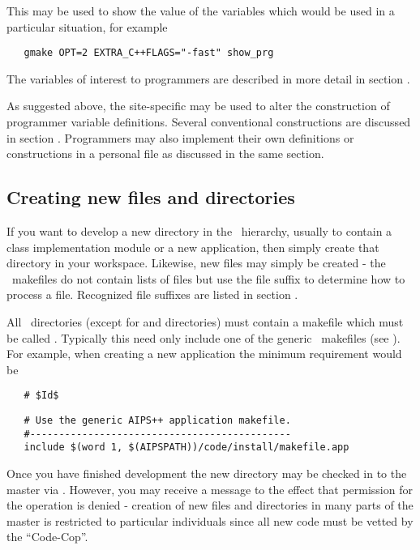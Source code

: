 \noindent
This may be used to show the value of the variables which would be used in a
particular situation, for example

\begin{verbatim}
   gmake OPT=2 EXTRA_C++FLAGS="-fast" show_prg
\end{verbatim}

\noindent
The variables of interest to programmers are described in more detail in
section .

As suggested above, the site-specific  may be used to alter
the construction of programmer variable definitions.  Several conventional
constructions are discussed in section .  Programmers may also implement their own definitions or
constructions in a personal  file as discussed in the same
section.

\subsection*{Creating new files and directories}

If you want to develop a new directory in the \aipspp\ hierarchy, usually to
contain a class implementation module or a new application, then simply create
that directory in your workspace.  Likewise, new files may simply be created -
the \aipspp\ makefiles do not contain lists of files but use the file suffix
to determine how to process a file.  Recognized file suffixes are listed in
section .

All \aipspp\ directories (except for  and 
directories) must contain a makefile which must be called .
Typically this need only include one of the generic \aipspp\ makefiles (see
).  For example, when creating a new application the minimum
requirement would be

\noindent
\verb+   # $+\verb+Id$+

\begin{verbatim}
   # Use the generic AIPS++ application makefile.
   #---------------------------------------------
   include $(word 1, $(AIPSPATH))/code/install/makefile.app
\end{verbatim}

\noindent
Once you have finished development the new directory may be checked in to the
master via .  However, you may receive a message to the effect that
permission for the operation is denied - creation of new files and directories
in many parts of the master is restricted to particular individuals since all
new code must be vetted by the ``Code-Cop''.

